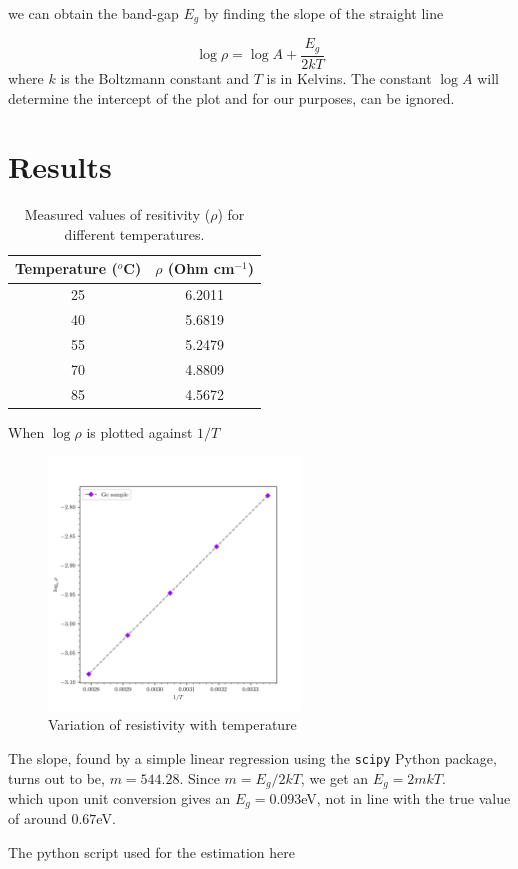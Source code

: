\documentclass{article}
\begin{document}
	 we can obtain the band-gap $E_g$ by finding the slope of the straight line
	 
	 $$ \log \rho = \log A + \frac{E_g}{2kT} $$
		where $k$ is the Boltzmann constant and $T$ is in Kelvins. The constant $\log A$ will determine the intercept of the plot and for our purposes, can be ignored.
		
	\section*{Results}
	\begin{table}[h]
		\centering
		\begin{tabular}{|c|c|}
			\hline
			Temperature ($^o$C) & $\rho$ (Ohm cm$^{-1}$) \\
			\hline
			25 & 6.2011  \\
			40 & 5.6819 \\
			55 & 5.2479 \\
			70 & 4.8809 \\
			85 & 4.5672 \\
			\hline
		\end{tabular}
	\caption{Measured values of resitivity ($\rho$) for different temperatures.}
	\label{meastable}
	\end{table}

	When $\log \rho$ is plotted against $1/T$
	
	\begin{figure}[h!]
		\centering
		\includegraphics[width=0.6\textwidth]{temp_rho_var}
		\caption{Variation of resistivity with temperature}
		\label{fig:temp_var}
	\end{figure}

	The slope, found by a simple linear regression using the \texttt{scipy} Python package, turns out to be, $m=544.28$. Since $ m = E_g/2kT$, we get an $E_g = 2mkT$.\\
	
	which upon unit conversion gives an $E_g = 0.093$eV, not in line with the true value of around $0.67$eV.
	
	The python script used for the estimation here
\end{document}
